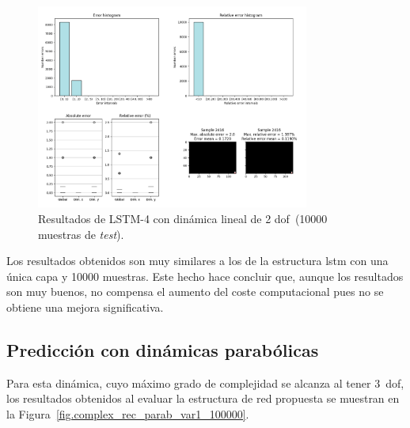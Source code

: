 \begin{figure}[H]
		\begin{center}
			\includegraphics[width=0.8\textwidth]{ figures/test_mod/REC/complex/linear_var_100000.png}
			\caption{Resultados de LSTM-4 con dinámica lineal de 2 \acrshort{dof}~(10000 muestras de \textit{test}).} 
			\label{fig.complex_rec_lin_var_100000}
		\end{center}
\end{figure}
\vspace{-10pt}
Los resultados obtenidos son muy similares a los de la estructura \acrshort{lstm} con una única capa y 10000 muestras. Este hecho hace concluir que, aunque los resultados son muy buenos, no compensa el aumento del coste computacional pues no se obtiene una mejora significativa.

\subsection{Predicción con dinámicas parabólicas}
Para esta dinámica, cuyo máximo grado de complejidad se alcanza al tener 3~\acrshort{dof}, los resultados obtenidos al evaluar la estructura de red propuesta se muestran en la Figura~\ref{fig.complex_rec_parab_var1_100000}.

